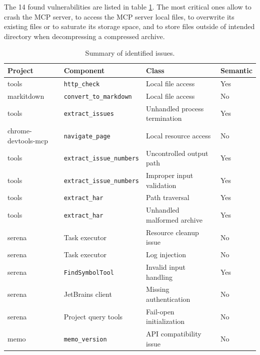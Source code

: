 


The 14 found vulnerabilities are listed in table \ref{tab:identified_issues}. The most critical ones allow to crash the MCP server, to access the MCP server local files, to overwrite its existing files or to saturate its storage space, and to store files outside of intended directory when decompressing a compressed archive.

\begin{table}[h]
\centering
\caption{Summary of identified issues.}
\label{tab:identified_issues}
\begin{tabular}{llll}
\hline
\textbf{Project} & \textbf{Component} & \textbf{Class} & \textbf{Semantic} \\
\hline
tools & \texttt{http\_check} & Local file access & Yes \\
markitdown & \texttt{convert\_to\_markdown} & Local file access & No \\
tools & \texttt{extract\_issues} & Unhandled process termination & Yes \\
chrome-devtools-mcp & \texttt{navigate\_page} & Local resource access & No \\
tools & \texttt{extract\_issue\_numbers} & Uncontrolled output path & Yes \\
tools & \texttt{extract\_issue\_numbers} & Improper input validation & Yes \\
tools & \texttt{extract\_har} & Path traversal & Yes \\
tools & \texttt{extract\_har} & Unhandled malformed archive & Yes \\
serena & Task executor & Resource cleanup issue & No \\
serena & Task executor & Log injection & No \\
serena & \texttt{FindSymbolTool} & Invalid input handling & Yes \\
serena & JetBrains client & Missing authentication & No \\
serena & Project query tools & Fail-open initialization & No \\
memo & \texttt{memo\_version} & API compatibility issue & No \\
\hline
\end{tabular}
\end{table}

